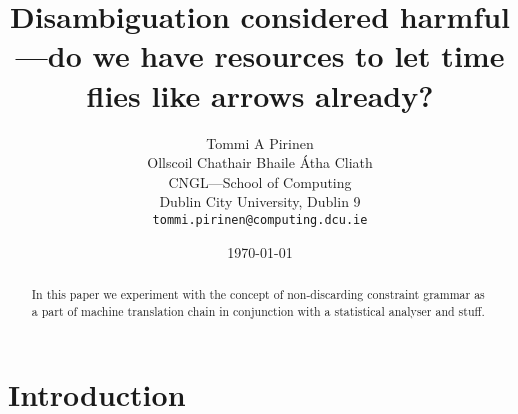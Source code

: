 \documentclass[11pt]{article}
\title{Disambiguation considered harmful---do we have resources to let time flies
like arrows already?}
\author{Tommi A Pirinen\\
Ollscoil Chathair Bhaile Átha Cliath\\
CNGL---School of Computing\\
Dublin City University, Dublin 9\\
{\tt tommi.pirinen@computing.dcu.ie}
}
\date{\today}
\begin{document}
\maketitle
\begin{abstract}
    In this paper we experiment with the concept of non-discarding constraint
    grammar as a part of machine translation chain in conjunction with a
    statistical analyser and stuff.
\end{abstract}

\section{Introduction}



\end{document}
